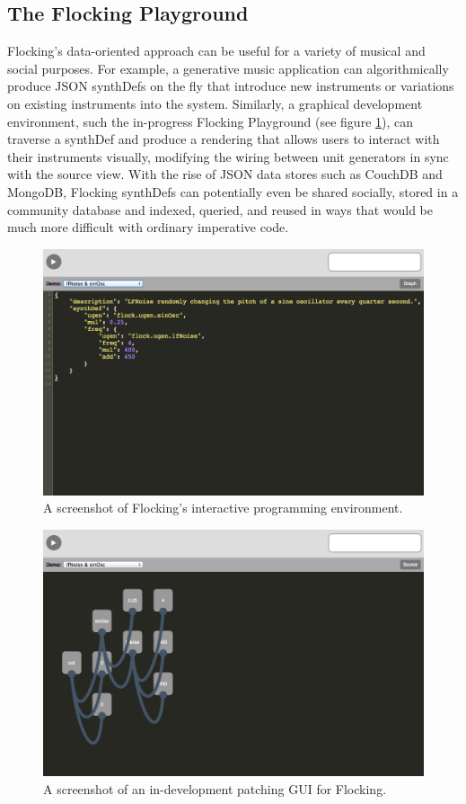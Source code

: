 \documentclass{article}
\begin{document}
\subsection{The Flocking Playground}

Flocking's data-oriented approach can be useful for a variety of musical and social purposes. For example, a generative music application can algorithmically produce JSON synthDefs on the fly that introduce new instruments or variations on existing instruments into the system. Similarly, a graphical development environment, such the in-progress Flocking Playground (see figure \ref{fig:playground}), can traverse a synthDef and produce a rendering that allows users to interact with their instruments visually, modifying the wiring between unit generators in sync with the source view. With the rise of JSON data stores such as CouchDB and MongoDB, Flocking synthDefs can potentially even be shared socially, stored in a community database and indexed, queried, and reused in ways that would be much more difficult with ordinary imperative code.

\begin{figure}[ht!]
\centering
\includegraphics[width=0.9\columnwidth]{images/flocking-playground-source-view.png}
\caption{ A screenshot of Flocking's interactive programming environment.\label{fig:playground}}
\end{figure}

\begin{figure}[ht]
\centering
\includegraphics[width=0.9\columnwidth]{images/flocking-playground-graphical-view.png}
\caption{ A screenshot of an in-development patching GUI for Flocking.\label{fig:graphical}}
\end{figure}
\end{document}
